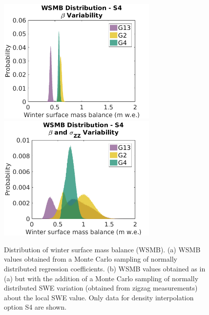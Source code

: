 \documentclass[12pt]{article}
\begin{document}
\begin{figure}[H]
	\centering
	\includegraphics[width =0.7\textwidth]{WSMB_beta.png}\\
	\includegraphics[width =0.7\textwidth]{WSMB_betaNsigmaZZ.png}\\
	\caption{Distribution of winter surface mass balance (WSMB). (a)  WSMB values obtained from a Monte Carlo sampling of normally distributed regression coefficients. (b) WSMB values obtained as in (a) but with the addition of a Monte Carlo sampling of normally distributed SWE variation (obtained from zigzag measurements) about the local SWE value. Only data for density interpolation option S4 are shown.}
	\label{fig:WSMB_oneDensity}
\end{figure}
\end{document}
